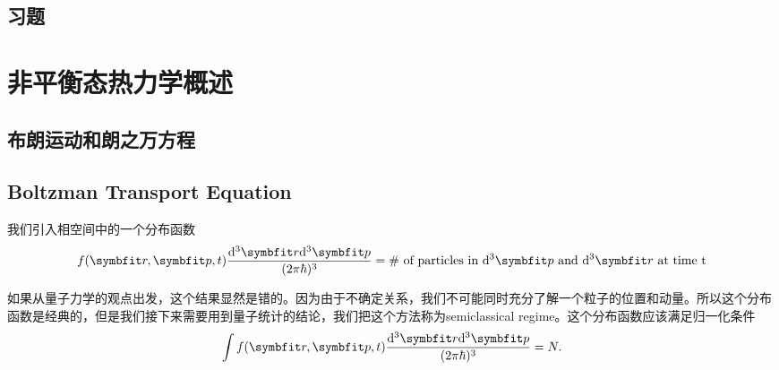\documentclass[AutoFakeBold]{tstextbook}
\begin{document}
\section{习题} %
\label{sec:习题14}

\chapter{非平衡态热力学概述} %
\label{cha:非平衡态热力学概述}
\section{布朗运动和朗之万方程} %
\label{sec:布朗运动和朗之万方程}

\section{Boltzman Transport Equation} %
\label{sec:Boltzman Transport Equation}
我们引入相空间中的一个分布函数\begin{equation}
    f(\bd{r},\bd{p},t)\frac{\di^3\bd{r}\di^3\bd{p}}{(2\pi\hbar)^3}=\# \text{ of particles in }\di^3 \bd{p} \text{ and }\di^3\bd{r}\text{ at time t}
\end{equation}

如果从量子力学的观点出发，这个结果显然是错的。因为由于不确定关系，我们不可能同时充分了解一个粒子的位置和动量。所以这个分布函数是经典的，但是我们接下来需要用到量子统计的结论，我们把这个方法称为semiclassical regime。这个分布函数应该满足归一化条件\begin{equation}
    \int f(\bd{r},\bd{p},t)\frac{\di^3\bd{r}\di^3\bd{p}}{(2\pi\hbar)^3} =N.
\end{equation}
\end{document}
